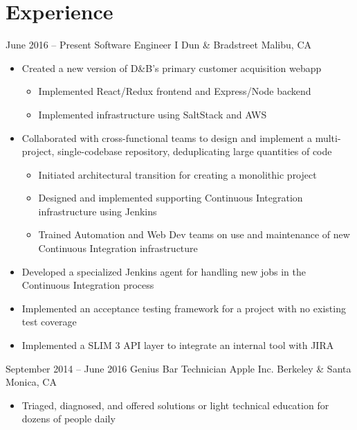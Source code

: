 \documentclass[11pt,a4paper,sans]{moderncv}        %
\begin{document}
\makecvtitle

\section{Experience}        %

\cventry
{June 2016 -- Present}          {Software Engineer I}
{Dun \& Bradstreet}             {Malibu, CA}
{}
{
\begin{itemize}
    \item Created a new version of D\&B's primary customer acquisition webapp
    \begin{itemize}
        \item Implemented React/Redux frontend and Express/Node backend
        \item Implemented infrastructure using SaltStack and AWS
    \end{itemize}
    \item Collaborated with cross-functional teams to design and implement a multi-project, single-codebase repository, deduplicating large quantities of code
    \begin{itemize}
        \item Initiated architectural transition for creating a monolithic project
        \item Designed and implemented supporting Continuous Integration infrastructure using Jenkins
        \item Trained Automation and Web Dev teams on use and maintenance of new Continuous Integration infrastructure
    \end{itemize}
    \item Developed a specialized Jenkins agent for handling new jobs in the Continuous Integration process
    \item Implemented an acceptance testing framework for a project with no existing test coverage
    \item Implemented a SLIM 3 API layer to integrate an internal tool with JIRA
\end{itemize}
}   %

\cventry
{September 2014 -- June 2016}	{Genius Bar Technician}
{Apple Inc.}	                {Berkeley \& Santa Monica, CA}
{}
{
\begin{itemize}
    \item Triaged, diagnosed, and offered solutions or light technical education for dozens of people daily
\end{itemize}
}   %
\end{document}
